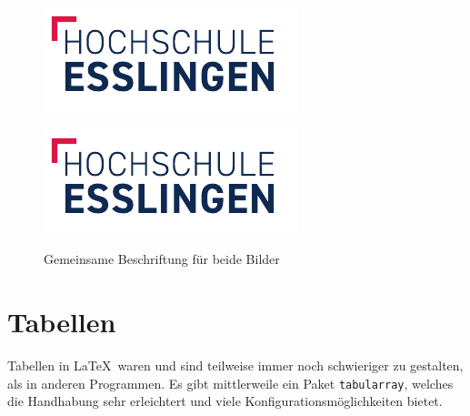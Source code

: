 \begin{figure}[htb!]
  \centering
  \begin{minipage}[t]{0.45\textwidth}
    \centering
    \includegraphics[width=\textwidth]{figures/hs-esslingen-logo}
    \label{fig:example1}
  \end{minipage}%
  \hfill
  \begin{minipage}[t]{0.45\textwidth}
    \centering
    \includegraphics[width=\textwidth]{figures/hs-esslingen-logo}
    \label{fig:example2}
  \end{minipage}
  \caption{Gemeinsame Beschriftung für beide Bilder}
  \label{fig:combined}
\end{figure}





\section{Tabellen}

Tabellen in \LaTeX\ waren und sind teilweise immer noch schwieriger zu
gestalten, als in anderen Programmen. Es gibt mittlerweile ein Paket
\texttt{tabularray}, welches die Handhabung sehr erleichtert und viele
Konfigurationsmöglichkeiten bietet.

